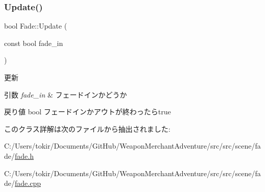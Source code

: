 \subsubsection{\texorpdfstring{Update()}{Update()}}
{\footnotesize\ttfamily bool Fade\+::\+Update (\begin{DoxyParamCaption}\item[{const bool}]{fade\+\_\+in }\end{DoxyParamCaption})}



更新 


\begin{DoxyParams}{引数}
{\em fade\+\_\+in} & フェードインかどうか \\
\hline
\end{DoxyParams}
\begin{DoxyReturn}{戻り値}
bool フェードインかアウトが終わったらtrue 
\end{DoxyReturn}


このクラス詳解は次のファイルから抽出されました\+:\begin{DoxyCompactItemize}
\item 
C\+:/\+Users/tokir/\+Documents/\+Git\+Hub/\+Weapon\+Merchant\+Adventure/src/src/scene/fade/\mbox{\hyperlink{fade_8h}{fade.\+h}}\item 
C\+:/\+Users/tokir/\+Documents/\+Git\+Hub/\+Weapon\+Merchant\+Adventure/src/src/scene/fade/\mbox{\hyperlink{fade_8cpp}{fade.\+cpp}}\end{DoxyCompactItemize}
